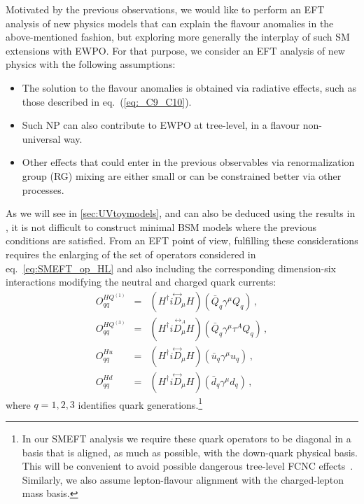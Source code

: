 Motivated by the previous observations, we would like to perform an EFT analysis of new physics models that can explain the flavour anomalies in the above-mentioned fashion, but exploring more generally the interplay of such SM extensions with EWPO. For that purpose, we consider an EFT analysis of new physics with the following assumptions:
\begin{itemize}
	\setlength\itemsep{0em}
	\item The solution to the flavour anomalies is obtained via radiative effects, such as those described in eq.~(\ref{eq:_C9_C10}).
	\item Such NP can also contribute to EWPO at tree-level, in a flavour non-universal way.
	\item Other effects that could enter in the previous observables via renormalization group (RG) mixing are either small or can be constrained better via other processes.
\end{itemize}
As we will see in \autoref{sec:UVtoymodels}, and can also be deduced using the results in \cite{deBlas:2017xtg}, it is not difficult to construct minimal BSM models where the previous conditions are satisfied.
%
From an EFT point of view, fulfilling these considerations requires the enlarging of the set of operators considered in eq.~\eqref{eq:SMEFT_op_HL} and also including the corresponding dimension-six interactions modifying the neutral and charged quark currents:
\begin{eqnarray} 
	\label{eq:SMEFT_op_HQ}
	O^{HQ^{(1)}}_{qq} &=& ( H^{\dagger} i \overset{\leftrightarrow}{D}_{\mu}H ) (\bar{Q}_{q} \gamma^{\mu}  Q_{q} )\,, \nonumber \\
	O^{HQ^{(3)}}_{qq} &=& ( H^{\dagger} i \overset{\, \leftrightarrow_A}{D_{\mu}}H ) (\bar{Q}_{q} \gamma^{\mu} \tau^{A} Q_{q} )\,, \nonumber \\
	O^{Hu}_{qq} &=& ( H^{\dagger} i \overset{\leftrightarrow}{D}_{\mu}H ) (\bar{u}_{q} \gamma^{\mu}  u_{q} )\,,\nonumber\\
	O^{Hd}_{qq} &=& ( H^{\dagger} i \overset{\leftrightarrow}{D}_{\mu}H ) (\bar{d}_{q} \gamma^{\mu}  d_{q} )\,,
\end{eqnarray}
where $q=1,2,3$ identifies quark generations.\footnote{
	In our SMEFT analysis we require these quark operators to be diagonal in a basis that is aligned, as much as possible, with the down-quark physical basis. This will be convenient to avoid possible dangerous tree-level FCNC effects~\cite{Silvestrini:2018dos}.
	Similarly, we also assume lepton-flavour alignment with the charged-lepton mass basis.
}
